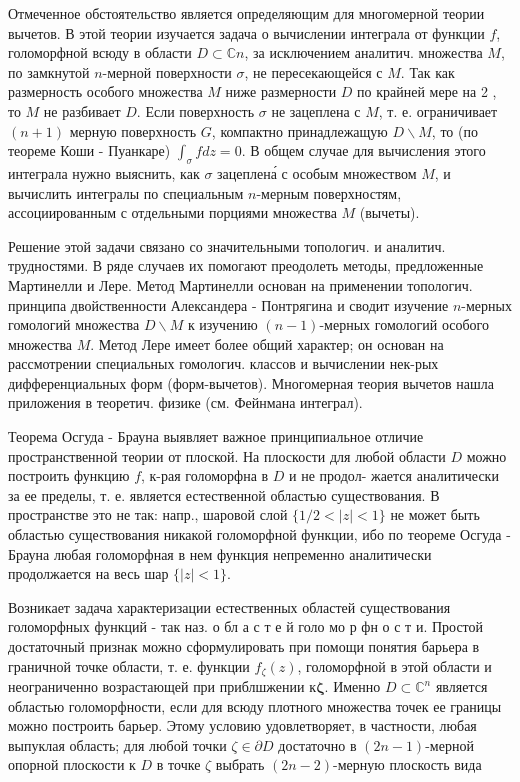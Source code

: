 \documentclass[10pt]{article}
\begin{document}
Отмеченное обстоятельство является определяющим для многомерной теории вычетов. В этой теории изучается задача о вычислении интеграла от функции $f$, голоморфной всюду в области $D \subset \mathbb{C} n$, за исключением аналитич. множества $M$, по замкнутой $n$-мерной поверхности $\sigma$, не пересекающейся с $M$. Так как размерность особого множества $M$ ниже размерности $D$ по крайней мере на 2 , то $M$ не разбивает $D$. Если поверхность $\sigma$ не зацеплена с $M$, т. е. ограничивает $(n+1)$ мерную поверхность $G$, компактно принадлежащую $D \backslash M$, то (по теореме Коши - Пуанкаре) $\int_{\sigma} f d z=0$. В общем случае для вычисления этого интеграла нужно выяснить, как $\sigma$ зацеплена́ с особым множеством $M$, и вычислить интегралы по специальным $n$-мерным поверхностям, ассоциированным с отдельными порциями множества $M$ (вычеты).



Решение этой задачи связано со значительными топологич. и аналитич. трудностями. В ряде случаев их помогают преодолеть методы, предложенные Мартинелли и Лере. Метод Мартинелли основан на применении топологич. принципа двойственности Александера - Понтрягина и сводит изучение $n$-мерных гомологий множества $D \backslash M$ к изучению $(n-1)$-мерных гомологий особого множества $M$. Метод Лере имеет более общий характер; он основан на рассмотрении специальных гомологич. классов и вычислении нек-рых дифференциальных форм (форм-вычетов). Многомерная теория вычетов нашла приложения в теоретич. физике (см. Фейнмана интеграл).



Теорема Осгуда - Брауна выявляет важное принципиальное отличие пространственной теории от плоской. На плоскости для любой области $D$ можно построить функцию $f$, к-рая голоморфна в $D$ и не продол- жается аналитически за ее пределы, т. е. является естественной областью существования. В пространстве это не так: напр., шаровой слой $\{1 / 2<|z|<1\}$ не может быть областью существования никакой голоморфной функции, ибо по теореме Осгуда - Брауна любая голоморфная в нем функция непременно аналитически продолжается на весь шар $\{|z|<1\}$.



Возникает задача характеризации естественных областей существования голоморфных функций - так наз. о бл а с т е й голо мо р фн о с т и. Простой достаточный признак можно сформулировать при помощи понятия барьера в граничной точке области, т. е. функции $f_{\zeta}(z)$, голоморфной в этой области и неограниченно возрастающей при приблшжении $к \boldsymbol{\zeta}$. Именно $D \subset \mathbb{C}^{n}$ является областью голоморфности, если для всюду плотного множества точек ее границы можно построить барьер. Этому условию удовлетворяет, в частности, любая выпуклая область; для любой точки $\zeta \in \partial D$ достаточно в $(2 n-1)$-мерной опорной плоскости к $D$ в точке $\zeta$ выбрать $(2 n-2)$-мерную плоскость вида
\end{document}

